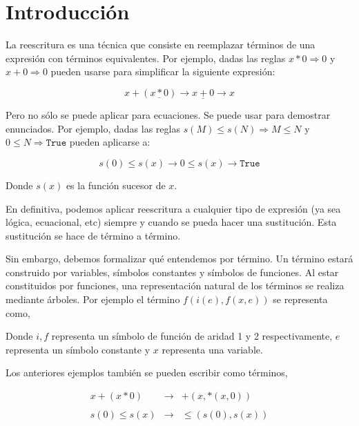 \chapter*{Introducción}

La reescritura es una técnica que consiste en reemplazar términos de
una expresión con términos equivalentes. Por ejemplo, dadas las reglas
$x * 0 \Rightarrow 0$ y $x + 0 \Rightarrow 0$ pueden usarse para
simplificar la siguiente expresión:

\[
x + (\underline{x*0}) \longrightarrow \underline{x + 0} \longrightarrow x
\]

Pero no sólo se puede aplicar para ecuaciones. Se puede usar para
demostrar enunciados. Por ejemplo, dadas las reglas
$s(M) \leq s(N) \Rightarrow M \leq N$ y
$0 \leq N \Rightarrow \texttt{True}$ pueden aplicarse a:

\[
  s(0) \leq s(x) \longrightarrow 0 \leq s(x) \longrightarrow
  \texttt{True}
\]

Donde $s(x)$ es la función sucesor de $x$.

En definitiva, podemos aplicar reescritura a cualquier tipo de
expresión (ya sea lógica, ecuacional, etc) siempre y cuando se pueda
hacer una sustitución. Esta sustitución se hace de término a término.

Sin embargo, debemos formalizar qué entendemos por término. Un término
estará construido por variables, símbolos constantes y símbolos de
funciones. Al estar constituidos por funciones, una representación
natural de los términos se realiza mediante árboles. Por ejemplo el
término $f(i(e),f(x,e))$ se representa como,

\begin{figure}[h]
  \centering
\end{figure}

Donde $i,f$ representa un símbolo de función de aridad 1 y 2
respectivamente, $e$ representa un símbolo constante y $x$ representa
una variable.

Los anteriores ejemplos también se pueden escribir como términos,

\[
  \begin{array}{rcl}
    x +(x*0) & \longrightarrow  & +(x,*(x,0)) \\ \\
    s(0) \leq s(x) & \longrightarrow & \leq(s(0),s(x)) \\ \\

  \end{array} 
\]


